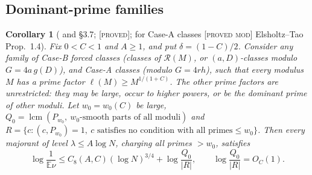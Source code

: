 \documentclass[10pt,reqno]{amsart}
\newtheorem{corollary}[theorem]{Corollary}
\theoremstyle{definition}
\theoremstyle{remark}
\newcommand{\cR}{\mathscr R}
\newcommand{\E}{\mathbb E}
\newcommand{\lcm}{\operatorname{lcm}}
\newcommand{\lab}[1]{\textup{[\textsc{#1}]}}
\begin{document}
\subsection{Dominant-prime families}
\begin{corollary}[{\cite[Cor.~3.6]{ET} and \S3.7}; \lab{proved}; for Case-A classes \lab{proved mod} Elsholtz--Tao Prop.~1.4]\label{cor:dominant}
Fix $0<C<1$ and $A\geq1$, and put $\delta=(1-C)/2$.  Consider any family of
Case-B forced classes (classes of $\cR(M)$, or $(a,D)$-classes modulo
$G=4a\,g(D)$), and Case-A classes (modulo $G=4rh$), such that every
modulus $M$ has a prime factor $\ell(M)\geq M^{1/(1+C)}$.  The other prime
factors are unrestricted: they may be large, occur to higher powers, or be
the dominant prime of other moduli.  Let $w_0=w_0(C)$ be large,
$Q_0=\lcm(P_{w_0},\ w_0\text{-smooth parts of all moduli})$ and
$R=\{c:(c,P_{w_0})=1,\ c\text{ satisfies no condition with all primes}\leq w_0\}$.
Then every majorant of level $\lambda\leq A\log N$, charging all primes
$>w_0$, satisfies
\[
 \log\frac1{\E\nu}\leq C_8(A,C)(\log N)^{3/4}+\log\frac{Q_0}{|R|},
 \qquad\log\frac{Q_0}{|R|}=O_C(1).
\]
\end{corollary}
\end{document}

